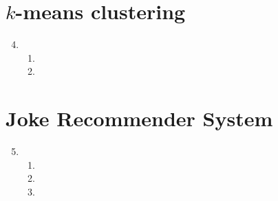 \documentclass[11pt,letterpaper]{article}
\theoremstyle{definition}
\theoremstyle{plain}
\numberwithin{equation}{section}
\numberwithin{figure}{section}
\begin{document}
\section{\texorpdfstring{$k$-means clustering}{k-means clustering}}
\begin{enumerate}
\setcounter{enumi}{3}
	\item \begin{enumerate}
		\item
		\item 
	\end{enumerate}
\end{enumerate}
















\section{Joke Recommender System}
\begin{enumerate}
\setcounter{enumi}{4}
	\item \begin{enumerate}
		\item
		\item 
		\item 
	\end{enumerate}
\end{enumerate}
\end{document}
